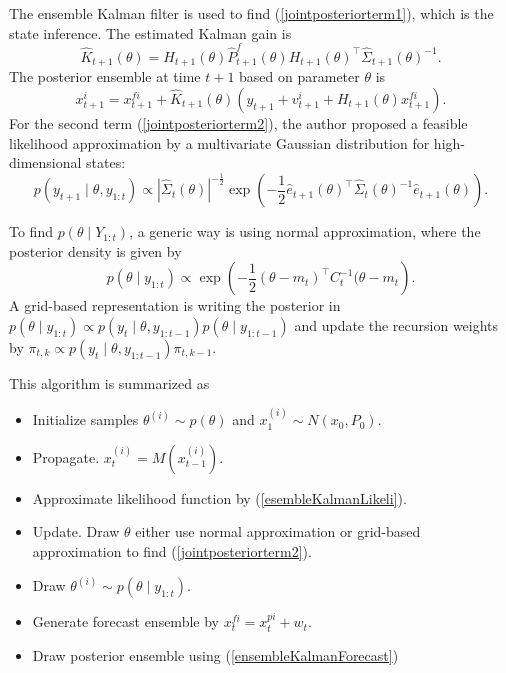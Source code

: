 The ensemble Kalman filter is used to find (\ref{jointposteriorterm1}), which is the state inference. The estimated Kalman gain is 
\begin{equation*}
\hat{K}_{t+1}(\theta) = H_{t+1}(\theta)\hat{P}_{t+1}^f(\theta)H_{t+1}(\theta)^\top \hat{\Sigma}_{t+1}(\theta)^{-1}.
\end{equation*}
The posterior ensemble at time $t+1$ based on parameter $\theta$ is
\begin{equation}\label{ensembleKalmanForecast}
x_{t+1}^i = x_{t+1}^{fi}+\hat{K}_{t+1}(\theta)(y_{t+1}+v_{t+1}^i+H_{t+1}(\theta)x_{t+1}^{fi}).
\end{equation}
For the second term (\ref{jointposteriorterm2}), the author \cite{stroud2016bayesian} proposed a feasible likelihood approximation by a multivariate Gaussian distribution \cite{mitchell2000adaptive} for high-dimensional states: 
\begin{equation}\label{esembleKalmanLikeli}
p(y_{t+1}\mid\theta,y_{1:t})\propto \left| \hat{\Sigma}_t(\theta)  \right|^{-\frac{1}{2}} \exp \left( -\frac{1}{2} \hat{e}_{t+1}(\theta)^\top \hat{\Sigma}_t(\theta)^{-1} \hat{e}_{t+1}(\theta) \right).
\end{equation}

To find $p(\theta\mid Y_{1:t})$, a generic way is using normal approximation, where the posterior density  is given by 
\begin{equation*}
p(\theta\mid y_{1:t}) \propto \exp \left(  -\frac{1}{2}(\theta-m_t)^\top C_t^{-1}(\theta-m_t  \right).
\end{equation*}
A grid-based representation is writing the posterior in $p(\theta\mid y_{1:t}) \propto p(y_t\mid\theta,y_{1:t-1})p(\theta\mid y_{1:t-1})$ and update the recursion weights by $\pi_{t,k}\propto p(y_{t}\mid\theta,y_{1:t-1})\pi_{t,k-1}$. 

This algorithm is summarized as 
\begin{itemize}
\item Initialize samples $\theta^{(i)}\sim p(\theta)$ and $x_1^{(i)}\sim N(x_0,P_0)$.
\item Propagate. $x_t^{(i)} = M(x_{t-1}^{(i)})$.
\item Approximate likelihood function by (\ref{esembleKalmanLikeli}). 
\item Update. Draw $\theta$ either use normal approximation or grid-based approximation to find (\ref{jointposteriorterm2}). 
\item Draw $\theta^{(i)}\sim p(\theta\mid y_{1:t})$.
\item Generate forecast ensemble by $x_t^{fi} = x_t^{pi}+w_t$.
\item Draw posterior ensemble using (\ref{ensembleKalmanForecast})
\end{itemize}




